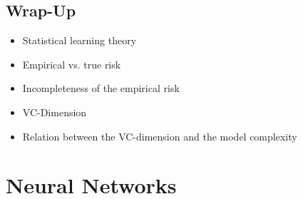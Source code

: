 	\section{Wrap-Up}
		\begin{itemize}
			\item Statistical learning theory
			\item Empirical vs. true risk
			\item Incompleteness of the empirical risk
			\item VC-Dimension
			\item Relation between the VC-dimension and the model complexity
		\end{itemize}

\chapter{Neural Networks}
